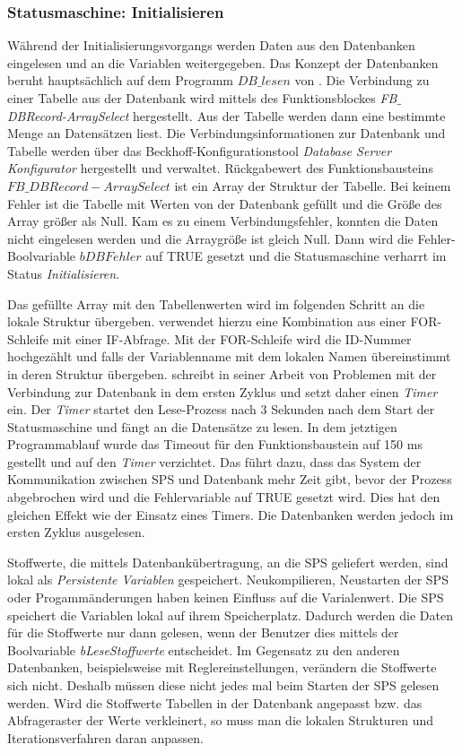 \subsubsection*{Statusmaschine: Initialisieren}

Während der Initialisierungsvorgangs werden Daten aus den Datenbanken eingelesen und an die Variablen weitergegeben. Das Konzept der Datenbanken beruht hauptsächlich auf dem Programm $DB\_lesen$ von \textsc{\citeauthor{Nuerenberg2015}}\citep{Nuerenberg2015}. 
Die Verbindung zu einer Tabelle aus der Datenbank wird mittels des Funktionsblockes \textit{FB$\_$DBRecord-ArraySelect} hergestellt. Aus der Tabelle werden dann eine bestimmte Menge an Datensätzen liest. 
Die Verbindungsinformationen zur Datenbank und Tabelle werden über das Beckhoff-Konfigurationstool \textit{Database Server Konfigurator} hergestellt und verwaltet. 
Rückgabewert des Funktionsbausteins $FB\_DBRecord-ArraySelect$ ist ein Array der Struktur der Tabelle. Bei keinem Fehler ist die Tabelle mit Werten von der Datenbank gefüllt und die Größe des Array größer als Null. Kam es zu einem Verbindungsfehler, konnten die Daten nicht eingelesen werden und die Arraygröße ist gleich Null. Dann wird die Fehler-Boolvariable $bDBFehler$ auf TRUE gesetzt und die Statusmaschine verharrt im Status \textit{Initialisieren}. 

Das gefüllte Array mit den Tabellenwerten wird im folgenden Schritt an die lokale Struktur übergeben. \textsc{\citeauthor{Nuerenberg2015}} verwendet hierzu eine Kombination aus einer FOR-Schleife mit einer IF-Abfrage. Mit der FOR-Schleife wird die ID-Nummer hochgezählt und falls der Variablenname mit dem lokalen Namen übereinstimmt in deren Struktur übergeben.  
\textsc{\citeauthor{Nuerenberg2015}} schreibt in seiner Arbeit von Problemen mit der Verbindung zur Datenbank in dem ersten Zyklus und setzt daher einen \textit{Timer} ein. Der \textit{Timer} startet den Lese-Prozess nach 3 Sekunden nach dem Start der Statusmaschine und fängt an die Datensätze zu lesen. In dem jetztigen Programmablauf wurde das Timeout für den Funktionsbaustein auf 150 ms gestellt und auf den \textit{Timer} verzichtet. Das führt dazu, dass das System der Kommunikation zwischen SPS und Datenbank mehr Zeit gibt, bevor der Prozess abgebrochen wird und die Fehlervariable auf TRUE gesetzt wird. Dies hat den gleichen Effekt wie der Einsatz eines Timers. Die Datenbanken werden jedoch im ersten Zyklus ausgelesen. 

Stoffwerte, die mittels Datenbankübertragung, an die SPS geliefert werden, sind lokal als \textit{Persistente Variablen} gespeichert. Neukompilieren, Neustarten der SPS oder Progammänderungen haben keinen Einfluss auf die Varialenwert. Die SPS speichert die Variablen lokal auf ihrem Speicherplatz. Dadurch werden die Daten für die Stoffwerte nur dann gelesen, wenn der Benutzer dies mittels der Boolvariable \textit{bLeseStoffwerte} entscheidet. Im Gegensatz zu den anderen Datenbanken, beispielsweise mit Reglereinstellungen, verändern die Stoffwerte sich nicht. Deshalb müssen diese nicht jedes mal beim Starten der SPS gelesen werden. Wird die Stoffwerte Tabellen in der Datenbank angepasst bzw. das Abfrageraster der Werte verkleinert, so muss man die lokalen Strukturen und Iterationsverfahren daran anpassen. 

